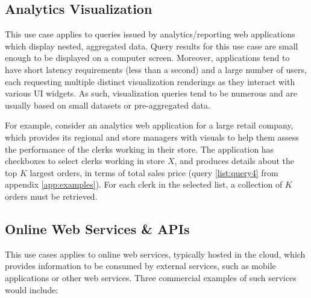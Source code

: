 
\subsection{Analytics Visualization}

This use case applies to queries issued by analytics/reporting web applications which display nested, aggregated data. Query results for this use case are small enough to be displayed on a computer screen. Moreover, applications tend to have short latency requirements (less than a second) and a large number of users, each requesting multiple distinct visualization renderings as they interact with various UI widgets. As such, visualization queries tend to be numerous and are usually based on small datasets or pre-aggregated data.

For example, consider an analytics web application for a large retail company, which provides its regional and store managers with visuals to help them assess the performance of the clerks working in their store. The application has checkboxes to select clerks working in store $X$, and produces details about the top $K$ largest orders, in terms of total sales price (query \ref{list:query4} from appendix \ref{app:examples}). For each clerk in the selected list, a collection of $K$ orders must be retrieved.

\subsection{Online Web Services \& APIs}

This use cases applies to online web services, typically hosted in the cloud, which provides information to be consumed by external services, such as mobile applications or other web services. Three commercial examples of such services would include:

